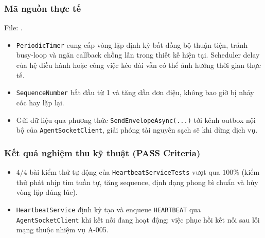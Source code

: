 \documentclass[12pt,a4paper]{article}
\begin{document}
\subsubsection{Mã nguồn thực tế}
File: .

\begin{orientationbox}
\begin{itemize}[leftmargin=1.5em, itemsep=1pt]
  \item \texttt{PeriodicTimer} cung cấp vòng lặp định kỳ bất đồng bộ thuận tiện, tránh busy-loop và ngăn callback chồng lấn trong thiết kế hiện tại. Scheduler delay của hệ điều hành hoặc công việc kéo dài vẫn có thể ảnh hưởng thời gian thực tế.
  \item \texttt{SequenceNumber} bắt đầu từ 1 và tăng dần đơn điệu, không bao giờ bị nhảy cóc hay lặp lại.
  \item Gửi dữ liệu qua phương thức \texttt{SendEnvelopeAsync(...)} tới kênh outbox nội bộ của \texttt{AgentSocketClient}, giải phóng tài nguyên sạch sẽ khi dừng dịch vụ.
\end{itemize}
\end{orientationbox}

\subsubsection{Kết quả nghiệm thu kỹ thuật (PASS Criteria)}
\begin{itemize}
  \item $4/4$ bài kiểm thử tự động của \texttt{HeartbeatServiceTests} vượt qua $100\%$ (kiểm thử phát nhịp tim tuần tự, tăng sequence, định dạng phong bì chuẩn và hủy vòng lặp đúng lúc).
  \item \texttt{HeartbeatService} định kỳ tạo và enqueue \texttt{HEARTBEAT} qua \texttt{AgentSocketClient} khi kết nối đang hoạt động; việc phục hồi kết nối sau lỗi mạng thuộc nhiệm vụ A-005.
\end{itemize}
\end{document}
